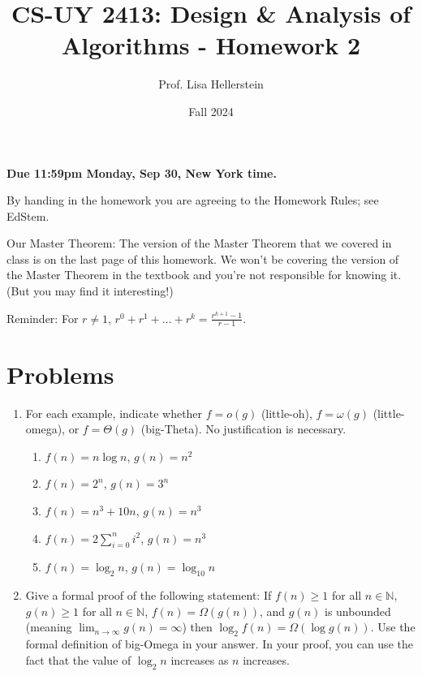 \documentclass{article}
\title{CS-UY 2413: Design \& Analysis of Algorithms - Homework 2}
\author{Prof. Lisa Hellerstein}
\date{Fall 2024}
\begin{document}
\maketitle

\textbf{Due 11:59pm Monday, Sep 30, New York time.}

By handing in the homework you are agreeing to the Homework Rules; see EdStem.

Our Master Theorem: The version of the Master Theorem that we covered in class is on the last page of this homework. We won’t be covering the version of the Master Theorem in the textbook and you’re not responsible for knowing it. (But you may find it interesting!)

Reminder: For $r \neq 1$, $r^0 + r^1 + \dots + r^k = \frac{r^{k+1} - 1}{r - 1}$.

\section*{Problems}

\begin{enumerate}
    \item For each example, indicate whether $f = o(g)$ (little-oh), $f = \omega(g)$ (little-omega), or $f = \Theta(g)$ (big-Theta). No justification is necessary.
    \begin{enumerate}
        \item $f(n) = n \log n$, $g(n) = n^2$
        \item $f(n) = 2^n$, $g(n) = 3^n$
        \item $f(n) = n^3 + 10n$, $g(n) = n^3$
        \item $f(n) = 2 \sum_{i=0}^n i^2$, $g(n) = n^3$
        \item $f(n) = \log_2 n$, $g(n) = \log_{10} n$
    \end{enumerate}
\end{enumerate}

\begin{enumerate}
    \setcounter{enumi}{1}
    \item Give a formal proof of the following statement: If $f(n) \ge 1$ for all $n \in \mathbb{N}$, $g(n) \ge 1$ for all $n \in \mathbb{N}$, $f(n) = \Omega(g(n))$, and $g(n)$ is unbounded (meaning $\lim_{n \to \infty} g(n) = \infty$) then $\log_2 f(n) = \Omega(\log g(n))$.
    Use the formal definition of big-Omega in your answer. In your proof, you can use the fact that the value of $\log_2 n$ increases as $n$ increases.
\end{enumerate}
\end{document}
